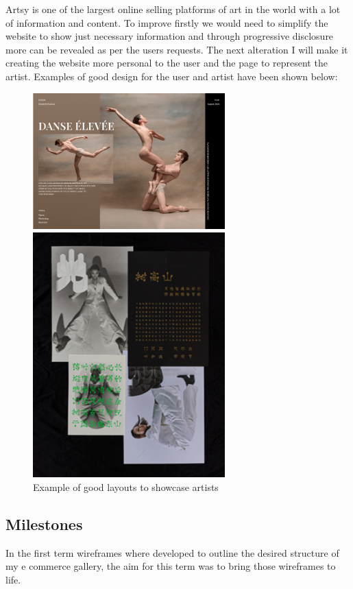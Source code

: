 \documentclass[]{project_final}
\begin{document}
\newpage

Artsy is one of the largest online selling platforms of art in the world with a lot of information and content. To improve firstly we would need to simplify the website to show just necessary information and through progressive disclosure more can be revealed as per the users requests.
The next alteration I will make it creating the website more personal to the user and the page to represent the artist. Examples of good design for the user and artist have been shown below:

\begin{figure}[ht!]
  \centering
  \begin{minipage}[t]{0.4\textwidth}
    \includegraphics[width=20em]{artGalleryExample.png}
  \end{minipage}
  \hfill
  \begin{minipage}[t]{0.4\textwidth}
    \includegraphics[width=20em]{artGalleryExample2.png}
  \end{minipage}
  \caption{Example of good layouts to showcase artists}
  \label{fig:1}
\end{figure}
\subsection{Milestones}
In the first term wireframes where developed to outline the desired structure of my e commerce gallery, the aim for this term was to bring those wireframes to life.
\end{document}

